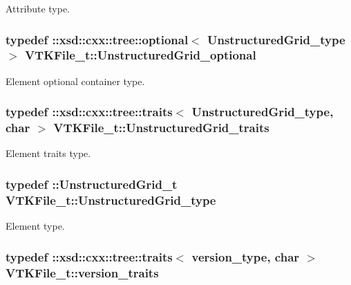 Attribute type. 

\hypertarget{classVTKFile__t_ada5bb5a706e03ef1ab2ed1513ea83833}{
\subsubsection[{Unstructured\+Grid\+\_\+optional}]{\setlength{\rightskip}{0pt plus 5cm}typedef \+::xsd\+::cxx\+::tree\+::optional$<$ {\bf Unstructured\+Grid\+\_\+type} $>$ {\bf V\+T\+K\+File\+\_\+t\+::\+Unstructured\+Grid\+\_\+optional}}}\label{classVTKFile__t_ada5bb5a706e03ef1ab2ed1513ea83833}


Element optional container type. 

\hypertarget{classVTKFile__t_a02772a5f713678f02e94188d6a552528}{
\subsubsection[{Unstructured\+Grid\+\_\+traits}]{\setlength{\rightskip}{0pt plus 5cm}typedef \+::xsd\+::cxx\+::tree\+::traits$<$ {\bf Unstructured\+Grid\+\_\+type}, char $>$ {\bf V\+T\+K\+File\+\_\+t\+::\+Unstructured\+Grid\+\_\+traits}}}\label{classVTKFile__t_a02772a5f713678f02e94188d6a552528}


Element traits type. 

\hypertarget{classVTKFile__t_a34ea02f6804e701657f11a8dc3851951}{
\subsubsection[{Unstructured\+Grid\+\_\+type}]{\setlength{\rightskip}{0pt plus 5cm}typedef \+::{\bf Unstructured\+Grid\+\_\+t} {\bf V\+T\+K\+File\+\_\+t\+::\+Unstructured\+Grid\+\_\+type}}}\label{classVTKFile__t_a34ea02f6804e701657f11a8dc3851951}


Element type. 

\hypertarget{classVTKFile__t_a5a343e08417564e5db3f48859b1a0c5f}{
\subsubsection[{version\+\_\+traits}]{\setlength{\rightskip}{0pt plus 5cm}typedef \+::xsd\+::cxx\+::tree\+::traits$<$ {\bf version\+\_\+type}, char $>$ {\bf V\+T\+K\+File\+\_\+t\+::version\+\_\+traits}}}\label{classVTKFile__t_a5a343e08417564e5db3f48859b1a0c5f}


